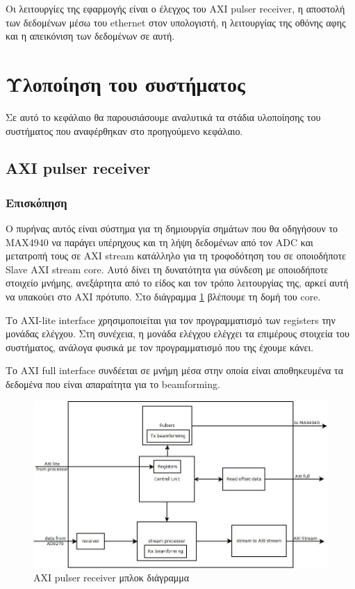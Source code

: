 \documentclass[12pt,a4paper]{book}
\begin{document}
Οι λειτουργίες της εφαρμογής είναι ο έλεγχος του AXI pulser receiver, η αποστολή των δεδομένων μέσω του ethernet στον υπολογιστή, η λειτουργίας της οθόνης αφης και η απεικόνιση των δεδομένων σε αυτή.


\section{Υλοποίηση του συστήματος}

Σε αυτό το κεφάλαιο θα παρουσιάσουμε αναλυτικά τα στάδια υλοποίησης του συστήματος που αναφέρθηκαν στο προηγούμενο κεφάλαιο. 

\subsection{AXI pulser receiver}

\subsubsection{Επισκόπηση}
Ο πυρήνας αυτός είναι σύστημα για τη δημιουργία σημάτων που θα οδηγήσουν το MAX4940 να παράγει υπέρηχους και τη λήψη δεδομένων από τον ADC και μετατροπή τους σε AXI stream κατάλληλο για τη τροφοδότηση του σε οποιοδήποτε Slave AXI stream core. Αυτό δίνει τη δυνατότητα για σύνδεση με οποιοδήποτε στοιχείο μνήμης, ανεξάρτητα από το είδος και τον τρόπο λειτουργίας της, αρκεί αυτή να υπακούει στο AXI πρότυπο. Στο διάγραμμα \ref{axi_pr_block} βλέπουμε τη δομή του core.

Το AXI-lite interface χρησιμοποιείται για τον προγραμματισμό των registers την μονάδας ελέγχου. Στη συνέχεια, η μονάδα ελέγχου ελέγχει τα επιμέρους στοιχεία του συστήματος, ανάλογα φυσικά με τον προγραμματισμό που της έχουμε κάνει.

Το AXI full interface συνδέεται σε μνήμη μέσα στην οποία είναι αποθηκευμένα τα δεδομένα που είναι απαραίτητα για το beamforming.

\begin{figure}
	\centering
	\includegraphics[width=\textwidth]{axi_pr_block}
	\caption{AXI pulser receiver μπλοκ διάγραμμα}
	\label{axi_pr_block}
\end{figure}
\end{document}
